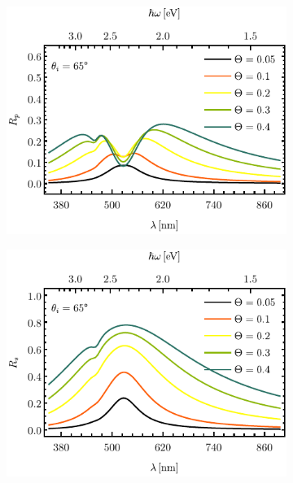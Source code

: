 \documentclass[letterpaper,11pt] {article}
\begin{document}
	\begin{figure}[t!]\centering
	\begin{subfigure}{.01\linewidth}\caption{}\label{sfig:FSM-cutp}\vspace{3.75cm}\end{subfigure}\hspace*{-1em}
	\begin{subfigure}{.45\linewidth}\centering \includegraphics[scale=1. ]{4-Wp4FSMThetaVar/cut_angle_65_p.pdf}\end{subfigure}
	\begin{subfigure}{.01\linewidth}\caption{}\label{sfig:FSM-cuts}\vspace{3.75cm}\end{subfigure}\hspace*{-1em}
	\begin{subfigure}{.45\linewidth}\centering \includegraphics[scale=1. ]{4-Wp4FSMThetaVar/cut_angle_65_s.pdf}\end{subfigure}

\end{figure}
\end{document}
